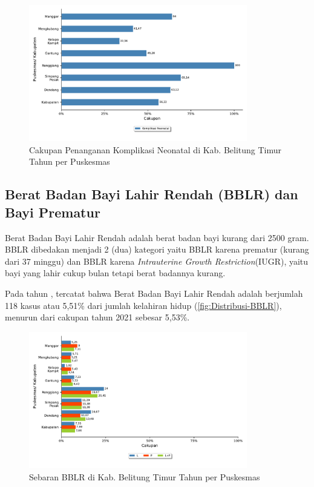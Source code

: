 \begin{figure}[H]
    \centering
    \includegraphics[width=0.85\textwidth]{bab_05/bab_05_12_komplikasiNeonatal}
    \caption{Cakupan Penanganan Komplikasi Neonatal di Kab. Belitung Timur Tahun \tP per Puskesmas}
    \label{fig:Pelayanan-Komplikasi-Neonatal}
\end{figure}


\subsection{Berat Badan Bayi Lahir Rendah (BBLR) dan Bayi Prematur}
Berat Badan Bayi Lahir Rendah adalah berat badan bayi kurang dari
2500 gram. BBLR dibedakan menjadi 2 (dua) kategori yaitu BBLR karena
prematur (kurang dari 37 minggu) dan BBLR karena \emph{Intrauterine Growth Restriction}(IUGR), yaitu bayi yang lahir cukup bulan tetapi berat badannya kurang.

Pada tahun \tP, tercatat bahwa Berat Badan Bayi Lahir Rendah adalah berjumlah
118 kasus atau 5,51\% dari jumlah kelahiran hidup (\autoref{fig:Distribusi-BBLR}), menurun dari cakupan tahun 2021 sebesar 5,53\%.

\begin{figure}[H]
  \centering
  \includegraphics[width=0.85\textwidth]{bab_05/bab_05_13_BBLR}
  \caption{Sebaran BBLR di Kab. Belitung Timur Tahun \tP per Puskesmas}
  \label{fig:Distribusi-BBLR}
\end{figure}

